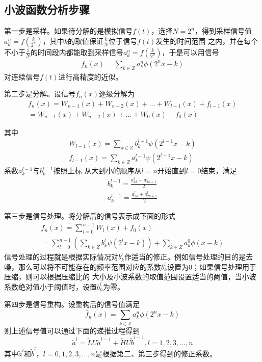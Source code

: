 \subsection{小波函数分析步骤}
第一步是采样。如果待分解的是模拟信号$f(t)$，选择$N=2^{n}$，得到采样信号值$a_{k}^{n}=f(\frac{k}{2^{n}})$，其中$k$的取值保证$\frac{k}{N}$位于信号$f(t)$发生的时间范围
之内，并在每个不小于$\frac{1}{N}$的时间段内都能取到采样信号$a_{k}^{n}=f(\frac{k}{2^{n}})$，于是可以用信号
\begin{gather}
f_{n}(x)=\sum_{k\in Z}a_{k}^{n}\phi(2^{n}x-k)
\end{gather}
对连续信号$f(t)$进行高精度的近似。
\par 第二步是分解。设信号$f_{n}(x)$逐级分解为
\begin{gather}
	f_{n}(x)=W_{n-1}(x)+W_{n-2}(x)+...+W_{l-1}(x)+f_{l-1}(x) \nonumber \\
			=W_{n-1}(x)+W_{n-2}(x)+...+W_{0}(x)+f_{0}(x)
\end{gather}
\par 其中
\begin{gather*}
W_{l-1}(x)=\sum_{k\in Z}b_{k}^{l-1}\psi(2^{l-1}x-k)\\
f_{l-1}(x)=\sum_{k\in Z}a_{k}^{l-1}\psi(2^{l-1}x-k)
\end{gather*}
系数$a_{k}^{l-1}$与$b_{k}^{l-1}$按照上标
从大到小的顺序从$l=n$开始直到$l=0$结束，满足
\begin{gather}
	b_{k}^{l-1}=\frac{a_{2k}^{l}-a_{2k+1}^{l}}{2}\\
	a_{k}^{l-1}=\frac{a_{2k}^{l}+a_{2k+1}^{l}}{2}
\end{gather}
\par 第三步是信号处理。将分解后的信号表示成下面的形式
\begin{gather}
	f_{n}(x)=\sum_{l=0}^{n-1}W_{l}(x)+f_{0}(x)\nonumber \\
			=\sum_{l=0}^{n-1}(\sum_{k\in Z}b_{k}^{l}\psi(2^{l}x-k))+\sum_{k\in Z}a_{k}^{0}\phi(x-k)
\end{gather}
信号处理的过程就是根据实际情况对$b_{k}^{l}$作适当的修正。例如信号处理的目的是去噪，那么可以将不可能存在的频率范围对应的系数$b_{k}^{l}$设置为0；如果信号处理用于压缩，则可以根据压缩比的
大小及小波系数的取值范围设置适当的阈值，当小波系数绝对值小于阈值时，设置$b_{k}^{l}$为零。
\par 第四步是信号重构。设重构后的信号值满足
\begin{equation}
	\widetilde{f_{n}}(x)=\sum_{k\in Z}a_{k}^{n}\phi(2^{n}x-k)
\end{equation}
则上述信号值可以通过下面的递推过程得到
\begin{equation}
	\widetilde{a}^{l}=\widetilde{L}U\widetilde{a}^{l-1}+\widetilde{H}U\widetilde{b}^{l-1}, l=1,2,3,...,n
\end{equation}
其中$\widetilde{a}^{l}$和$\widetilde{b}^{l}$，$l=0,1,2,3,...,n$是根据第二、第三步得到的修正系数。
